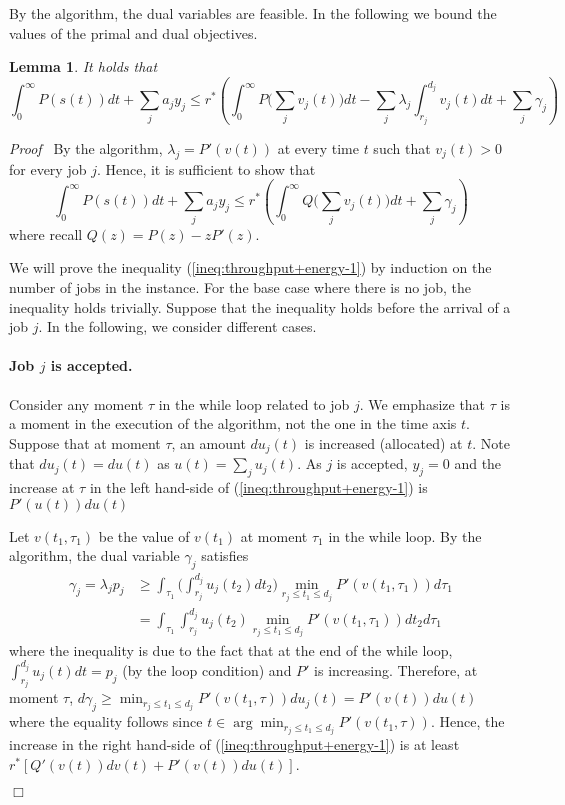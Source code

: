\documentclass[11pt]{article}
\newenvironment{proof}{\noindent\emph{Proof\ }}{\hspace*{\fill}$\Box$\medskip}
\newtheorem{lemma}{Lemma}
\begin{document}
By the algorithm, the dual variables are feasible. In the following
we bound the values of the primal and dual objectives.

\begin{lemma}		\label{lem:throughput+energy}
It holds that 
$$
\int_{0}^{\infty} P(s(t))dt + \sum_{j} a_{j} y_{j}  
\leq r^{*} \left( \int_{0}^{\infty} P\biggl(\sum_{j} v_{j}(t) \biggl)dt 
	- \sum_{j} \lambda_{j} \int_{r_{j}}^{d_{j}} v_{j}(t)dt  + \sum_{j} \gamma_{j} \right)
$$
\end{lemma}
\begin{proof}
By the algorithm, $\lambda_{j} = P'(v(t))$ at every time $t$ such that $v_{j}(t) > 0$
for every job $j$. Hence, it is sufficient to show that 
\begin{equation}	\label{ineq:throughput+energy-1}
\int_{0}^{\infty} P(s(t))dt + \sum_{j} a_{j} y_{j}  
\leq r^{*} \left( \int_{0}^{\infty} Q\biggl(\sum_{j} v_{j}(t) \biggl)dt  + \sum_{j} \gamma_{j} \right)
\end{equation}
where recall $Q(z) = P(z) - zP'(z)$.

We will prove the inequality (\ref{ineq:throughput+energy-1}) 
by induction on the number of jobs in the instance. For the base case where there is 
no job, the inequality holds trivially. Suppose that the inequality holds before the arrival of a job $j$.
In the following, we consider different cases.

\paragraph{Job $j$ is accepted.} 
Consider any moment $\tau$ in the while loop related to job $j$. We emphasize that $\tau$ is a moment 
in the execution of the algorithm, not the one in the time axis $t$.
Suppose that at moment $\tau$, an amount $du_{j}(t)$ is increased (allocated) at $t$. Note that 
$du_{j}(t) = du(t)$ as $u(t) = \sum_{j} u_{j}(t)$.
As $j$ is accepted, $y_{j} = 0$ and 
the increase at $\tau$ in the left hand-side of (\ref{ineq:throughput+energy-1})
is $P'(u(t))du(t)$ 

Let $v(t_{1},\tau_{1})$ be the value of $v(t_{1})$ at moment $\tau_{1}$ in 
the while loop.  By the algorithm, the dual variable $\gamma_{j}$ satisfies
\begin{align*}
\gamma_{j} = \lambda_{j} p_{j} 
&\geq \int_{\tau_{1}} \biggl( \int_{r_{j}}^{d_{j}} u_{j}(t_{2})dt_{2} \biggl) 
			\min_{r_{j} \leq t_{1} \leq d_{j}} P'(v(t_{1},\tau_{1}))d\tau_{1} \\
&= \int_{\tau_{1}} \int_{r_{j}}^{d_{j}} u_{j}(t_{2})
			\min_{r_{j} \leq t_{1} \leq d_{j}} P'(v(t_{1},\tau_{1})) dt_{2} d\tau_{1}
\end{align*}
where the inequality is due to the fact that at the end of the while loop, 
$\int_{r_{j}}^{d_{j}} u_{j}(t) dt = p_{j}$ (by the loop condition) and $P'$ is increasing. 
Therefore, at moment $\tau$, 
$d\gamma_{j} \geq \min_{r_{j} \leq t_{1} \leq d_{j}}P'(v(t_{1},\tau)) du_{j}(t) = P'(v(t))du(t)$
where the equality follows since $t \in \arg \min_{r_{j} \leq t_{1} \leq d_{j}} P'(v(t_{1},\tau))$.
Hence, the increase in the right hand-side of (\ref{ineq:throughput+energy-1}) is at least 
$r^{*}[Q'(v(t))dv(t) + P'(v(t))du(t)]$.


\end{proof}
\end{document}
